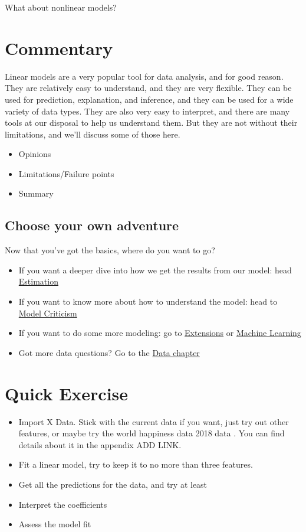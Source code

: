\documentclass[
  letterpaper,
]{krantz}
\providecommand{\tightlist}{%
  \setlength{\itemsep}{0pt}\setlength{\parskip}{0pt}}\usepackage{longtable,booktabs,array}
\begin{document}
What about nonlinear models?

\section{Commentary}\label{commentary-1}

Linear models are a very popular tool for data analysis, and for good
reason. They are relatively easy to understand, and they are very
flexible. They can be used for prediction, explanation, and inference,
and they can be used for a wide variety of data types. They are also
very easy to interpret, and there are many tools at our disposal to help
us understand them. But they are not without their limitations, and
we'll discuss some of those here.

\begin{itemize}
\tightlist
\item
  Opinions
\item
  Limitations/Failure points
\item
  Summary
\end{itemize}

\subsection{Choose your own
adventure}\label{choose-your-own-adventure-1}

Now that you've got the basics, where do you want to go?

\begin{itemize}
\tightlist
\item
  If you want a deeper dive into how we get the results from our model:
  head \hyperref[estimation]{Estimation}
\item
  If you want to know more about how to understand the model: head to
  \hyperref[model-criticism]{Model Criticism}
\item
  If you want to do some more modeling: go to
  \hyperref[extensions]{Extensions} or
  \hyperref[machine-learning]{Machine Learning}
\item
  Got more data questions? Go to the \hyperref[data]{Data chapter}
\end{itemize}

\section{Quick Exercise}\label{quick-exercise}

\begin{itemize}
\tightlist
\item
  Import X Data. Stick with the current data if you want, just try out
  other features, or maybe try the world happiness data 2018 data . You
  can find details about it in the appendix ADD LINK.
\item
  Fit a linear model, try to keep it to no more than three features.
\item
  Get all the predictions for the data, and try at least
\item
  Interpret the coefficients
\item
  Assess the model fit
\end{itemize}
\end{document}
